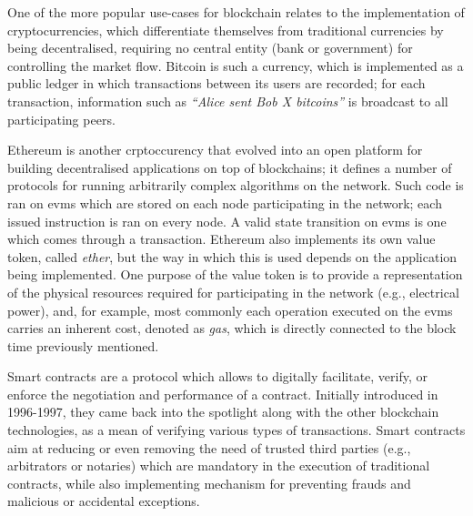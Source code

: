 One of the more popular use-cases for blockchain relates to the implementation of cryptocurrencies, which differentiate themselves from traditional currencies by being decentralised, requiring no central entity (bank or government) for controlling the market flow. Bitcoin is such a currency, which is implemented as a public ledger in which transactions between its users are recorded; for each transaction, information such as \emph{``Alice sent Bob X bitcoins''} is broadcast to all participating peers.

Ethereum is another crptoccurency that evolved into an open platform for building decentralised applications on top of blockchains; it defines a number of protocols for running arbitrarily complex algorithms on the network. Such code is ran on \glspl{evm} which are stored on each node participating in the network; each issued instruction is ran on every node. A valid state transition on \glspl{evm} is one which comes through a transaction\cite{gavin}. Ethereum also implements its own value token, called \emph{ether}, but the way in which this is used depends on the application being implemented. One purpose of the value token is to provide a representation of the physical resources required for participating in the network (e.g., electrical power), and, for example, most commonly each operation executed on the \glspl{evm} carries an inherent cost, denoted as \emph{gas}\cite{gavin}, which is directly connected to the block time previously mentioned.

Smart contracts are a protocol which allows to digitally facilitate, verify, or enforce the negotiation and performance of a contract. Initially introduced in 1996-1997\cite{szabo}, they came back into the spotlight along with the other blockchain technologies, as a mean of verifying various types of transactions. Smart contracts aim at reducing or even removing the need of trusted third parties (e.g., arbitrators or notaries) which are mandatory in the execution of traditional contracts, while also implementing mechanism for preventing frauds and malicious or accidental exceptions.


